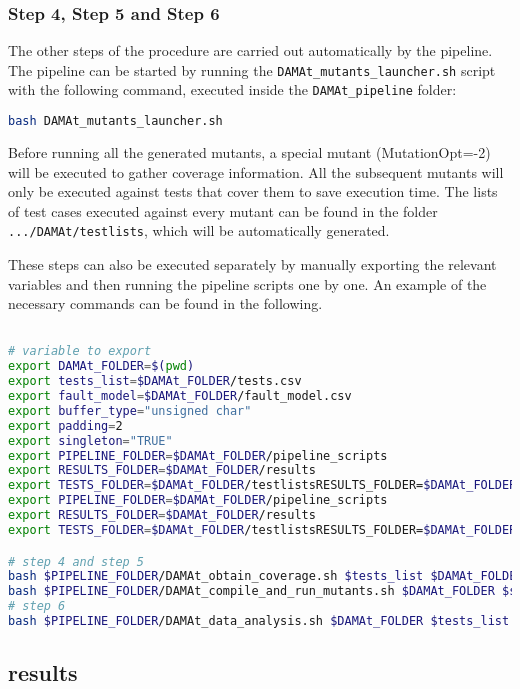\subsubsection{Step 4, Step 5 and Step 6}

The other steps of the \DAMA procedure are carried out automatically by the pipeline.
The pipeline can be started by running the \texttt{DAMAt\_mutants\_launcher.sh} script with the following command, executed inside the \texttt{DAMAt\_pipeline} folder:

\begin{lstlisting}[language=bash]
bash DAMAt_mutants_launcher.sh
\end{lstlisting}

Before running all the generated mutants, a special mutant (MutationOpt=-2) will be executed to gather coverage information.
All the subsequent mutants will only be executed against tests that cover them to save execution time.
The lists of test cases executed against every mutant can be found in the folder \texttt{.../DAMAt/testlists}, which will be automatically generated.

These steps can also be executed separately by manually exporting the relevant variables and then running the pipeline scripts one by one. An example of the necessary commands can be found in the following.

\begin{lstlisting}[label={lst:manual_commands}, language=bash]

# variable to export
export DAMAt_FOLDER=$(pwd)
export tests_list=$DAMAt_FOLDER/tests.csv
export fault_model=$DAMAt_FOLDER/fault_model.csv
export buffer_type="unsigned char"
export padding=2
export singleton="TRUE"
export PIPELINE_FOLDER=$DAMAt_FOLDER/pipeline_scripts
export RESULTS_FOLDER=$DAMAt_FOLDER/results
export TESTS_FOLDER=$DAMAt_FOLDER/testlistsRESULTS_FOLDER=$DAMAt_FOLDER/results
export PIPELINE_FOLDER=$DAMAt_FOLDER/pipeline_scripts
export RESULTS_FOLDER=$DAMAt_FOLDER/results
export TESTS_FOLDER=$DAMAt_FOLDER/testlistsRESULTS_FOLDER=$DAMAt_FOLDER/results

# step 4 and step 5
bash $PIPELINE_FOLDER/DAMAt_obtain_coverage.sh $tests_list $DAMAt_FOLDER $singleton
bash $PIPELINE_FOLDER/DAMAt_compile_and_run_mutants.sh $DAMAt_FOLDER $singleton
# step 6
bash $PIPELINE_FOLDER/DAMAt_data_analysis.sh $DAMAt_FOLDER $tests_list

\end{lstlisting}


\subsection{\DAMA results}

